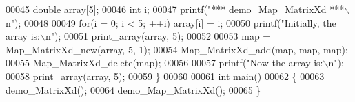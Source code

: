 \begin{DoxyCode}
00045   \textcolor{keywordtype}{double} array[5];
00046   \textcolor{keywordtype}{int} i;
00047   printf(\textcolor{stringliteral}{"*** demo\_Map\_MatrixXd ***\(\backslash\)n"});
00048   
00049   \textcolor{keywordflow}{for}(i = 0; i < 5; ++i) array[i] = i;
00050   printf(\textcolor{stringliteral}{"Initially, the array is:\(\backslash\)n"});
00051   print\_array(array, 5);
00052   
00053   map = Map\_MatrixXd\_new(array, 5, 1);
00054   Map\_MatrixXd\_add(map, map, map);
00055   Map\_MatrixXd\_delete(map);
00056 
00057   printf(\textcolor{stringliteral}{"Now the array is:\(\backslash\)n"});
00058   print\_array(array, 5);
00059 \}
00060 
00061 \textcolor{keywordtype}{int} main()
00062 \{
00063   demo\_MatrixXd();
00064   demo\_Map\_MatrixXd();
00065 \}
\end{DoxyCode}
